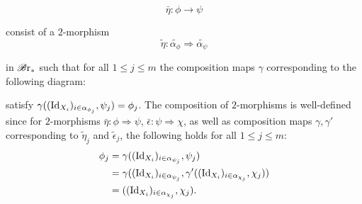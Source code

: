 \begin{defin}
\begin{enumerate}[(i)]
        $$\bar{\eta} \colon \phi \to \psi$$

        consist of a $2$-morphism 
        $$\widetilde{\eta} \colon \widetilde{\alpha_{\phi}} \Rightarrow
        \widetilde{\alpha_{\psi}}$$

        in $\mathscr{B} \text{r}_{\ast}$ such that for all $1 \leq j \leq m$ the composition maps
        $\gamma$ corresponding to the following diagram:
        \begin{center}
        \end{center}
        satisfy $\gamma((\operatorname{Id}_{X_i})_{i \in \alpha_{\phi_j}}, \psi_j) =
        \phi_j$. The composition of $2$-morphisms is well-defined since for
        $2$-morphisms $\bar{\eta} \colon \phi \Rightarrow \psi$, $\bar{\epsilon}
        \colon \psi \Rightarrow \chi$, as well as composition maps $\gamma,
        \gamma'$ corresponding to $\widetilde{\eta}_j$ and
        $\widetilde{\epsilon}_j$, the following holds for all $1 \leq j \leq m$:
        \begin{align*}
            \phi_j &= \gamma ((\operatorname{Id}_{X_i})_{i \in \alpha_{\psi_j}}, \psi_j) \\
            &= \gamma((\operatorname{Id}_{X_i})_{i \in \alpha_{\psi_j}}, \gamma'((\operatorname{Id}_{X_i})_{i \in \alpha_{\chi_j}}, \chi_j)) \\
            &= ((\operatorname{Id}_{X_i})_{i \in \alpha_{\chi_j}}, \chi_j).
        \end{align*}

    \end{enumerate}
\end{defin}

